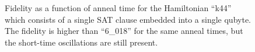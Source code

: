 \begin{figure}
	\caption[Single K44 Fidelity]{Fidelity as a function of anneal time for the Hamiltonian ``k44'' which consists of a single SAT clause embedded into a single qubyte.  The fidelity is higher than ``6\_018'' for the same anneal times, but the short-time oscillations are still present.}
	\label{fig:k44_comparison}
\end{figure}
